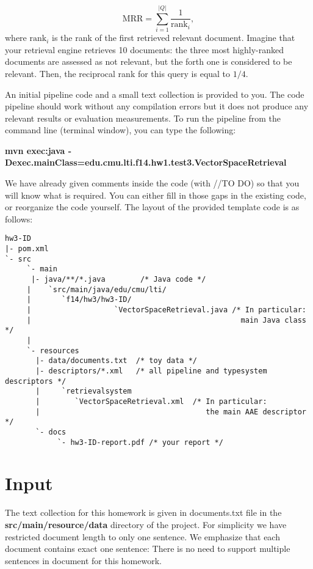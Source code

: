 \documentclass[oneside,11pt]{book}
\begin{document}
\begin{equation}\label{EqMRR}
\mbox{MRR} = \sum\limits_{i=1}^{|Q|} \frac{1} {\mbox{rank}_i},
\end{equation}
where $\mbox{rank}_i$ is the rank of the first retrieved relevant document.
Imagine that your retrieval engine retrieves 10 documents:
the three most highly-ranked documents are assessed as not relevant,
but the forth one is considered to be relevant. Then, the reciprocal
rank for this query is equal to $1/4$.

An initial pipeline code and a small text collection is provided to you. 
The code pipeline should work without any compilation errors but it does not produce any relevant results or evaluation measurements.
To run the pipeline from the command line (terminal window), you can type the following:

\begin{center}\small\textbf{mvn exec:java 
       -Dexec.mainClass=edu.cmu.lti.f14.hw1.test3.VectorSpaceRetrieval}\end{center}

We have already given comments inside the code (with //TO DO) so that you will know what is
required. 
You can either fill in those gaps in the existing code, or reorganize the code yourself.
The layout of the provided template code is as follows:

\hspace{-3em}
\begin{minipage}{0.9\textwidth}
\footnotesize
\begin{verbatim}
hw3-ID
|- pom.xml
`- src
     `- main
      |- java/**/*.java        /* Java code */
     |    `src/main/java/edu/cmu/lti/
     |       `f14/hw3/hw3-ID/
     |                   `VectorSpaceRetrieval.java /* In particular:
     |                                                main Java class */
     |                           
     `- resources
       |- data/documents.txt  /* toy data */ 
       |- descriptors/*.xml   /* all pipeline and typesystem descriptors */
       |     `retrievalsystem
       |        `VectorSpaceRetrieval.xml  /* In particular: 
       |                                      the main AAE descriptor */
       `- docs
            `- hw3-ID-report.pdf /* your report */

\end{verbatim}
\normalsize
\end{minipage}



\section{Input}
The text collection for this homework is given in documents.txt file in 
the \textbf{src/main/resource/data} directory of the project. 
For simplicity we have restricted document length to only one sentence. 
We emphasize that each document contains exact one sentence:
There is no need to support multiple sentences in document for this
homework.
\end{document}
